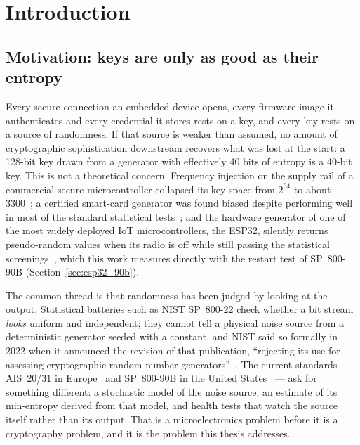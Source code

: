 \chapter{Introduction}
\label{ch:ch1_intro}


\section{Motivation: keys are only as good as their entropy}
\label{sec:motivation}

Every secure connection an embedded device opens, every firmware image it
authenticates and every credential it stores rests on a key, and every
key rests on a source of randomness. If that source is weaker than
assumed, no amount of cryptographic sophistication downstream recovers
what was lost at the start: a 128-bit key drawn from a generator with
effectively 40 bits of entropy is a 40-bit key. This is not a theoretical
concern. Frequency injection on the supply rail of a commercial secure
microcontroller collapsed its key space from $2^{64}$ to about
3300~\cite{markettos_2009_frequency}; a certified smart-card generator was
found biased despite performing well in most of the standard statistical
tests~\cite{hurleysmith_2018_certifiably}; and the hardware generator of
one of the most widely deployed IoT microcontrollers, the ESP32, silently
returns pseudo-random values when its radio is off while still passing
the statistical screenings~\cite{blancoromero_2026_entropy}, which this work
measures directly with the restart test of SP~800-90B
(Section~\ref{sec:esp32_90b}).

The common thread is that randomness has been judged by looking at the
output. Statistical batteries such as NIST SP~800-22 check whether a bit
stream \emph{looks} uniform and independent; they cannot tell a physical
noise source from a deterministic generator seeded with a constant, and
NIST said so formally in 2022 when it announced the revision of that
publication, ``rejecting its use for assessing cryptographic random
number generators''~\cite{nist_2022_decision}. The current standards
--- AIS~20/31 in Europe~\cite{peter_2024_ais31} and SP~800-90B in the
United States~\cite{turan_2018_sp80090b} --- ask for something different:
a stochastic model of the noise source, an estimate of its min-entropy
derived from that model, and health tests that watch the source itself
rather than its output. That is a microelectronics problem before it is a
cryptography problem, and it is the problem this thesis addresses.

